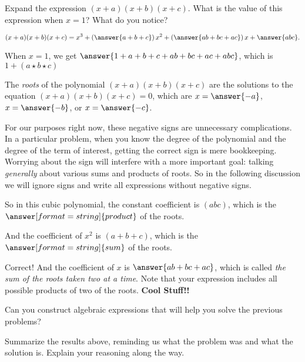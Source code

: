 \documentclass{ximera}
\begin{document}
\begin{problem}
Expand the expression $(x+a)(x+b)(x+c)$.  What is the value of this expression when $x=1$?  What do you notice?

\begin{prompt}
\[
(x+a)(x+b)(x+c) = x^3+ \left(\answer{a+b+c}\right)x^2+\left(\answer{ab+bc+ac}\right)x+\answer{abc}.  
\]

When $x=1$, we get $\answer{1+a+b+c+ab+bc+ac+abc}$, which is $1+(a\star b\star c)$
\end{prompt}
\begin{problem}
The \emph{roots} of the polynomial $(x+a)(x+b)(x+c)$ are the solutions to the equation $(x+a)(x+b)(x+c)=0$, which are 
$x=\answer{-a}$, $x=\answer{-b}$, or $x=\answer{-c}$.  

\begin{warning}
For our purposes right now, these negative signs are unnecessary complications.  In a particular problem, when you know the degree of the polynomial and the degree of the term of interest, getting the correct sign is mere bookkeeping.  Worrying about the sign will interfere with a more important goal: talking \emph{generally} about various sums and products of roots.  So in the following discussion we will ignore signs and write all expressions without negative signs.  
\end{warning}

So in this cubic polynomial, the constant coefficient is $(abc)$, which is the $\answer[format=string]{product}$ of the roots.  

And the coefficient of $x^2$ is $(a+b+c)$, which is the $\answer[format=string]{sum}$ of the roots.  

\begin{problem}
Correct!  And the coefficient of $x$ is $\answer{ab+bc+ac}$, which is called \emph{the sum of the roots taken two at a time}.  Note that your expression includes all possible products of two of the roots.  \textbf{Cool Stuff!!}
\end{problem}
\end{problem}
\end{problem}

\newpage 

\begin{problem}
Can you construct algebraic expressions that will help you solve the previous problems?  
\begin{freeResponse}
\end{freeResponse}
\vfill
\end{problem}

\begin{problem}
Summarize the results above, reminding us what the problem was and
what the solution is. Explain your reasoning along the way.
\begin{freeResponse}
\end{freeResponse}
\vfill
\end{problem}
\end{document}
